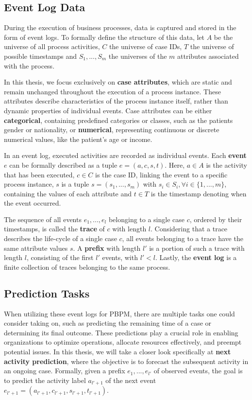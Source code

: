 
\subsection{Event Log Data}
\label{sec:event_log}
During the execution of business processes, data is captured and stored in the form of event logs.
To formally define the structure of this data,
let $A$ be the universe of all process activities,
$C$ the universe of case IDs,
$T$ the universe of possible timestamps
and $S_1, ..., S_m$ the universes of the $m$ attributes associated with the process.

In this thesis, we focus exclusively on \textbf{case attributes},
which are static and remain unchanged throughout the execution of a process instance.
These attributes describe characteristics of the process instance itself,
rather than dynamic properties of individual events.
Case attributes can be either \textbf{categorical},
containing predefined categories or classes, such as the patients gender or nationality,
or \textbf{numerical}, representing continuous or discrete numerical values, like the patient's age or income. 

In an event log, executed activities are recorded as individual events.
Each \textbf{event} $e$ can be formally described as a tuple $e = (a, c, s, t)$.
Here, $a \in A$ is the activity that has been executed,
$c \in C$ is the case ID, linking the event to a specific process instance,
$s$ is a tuple $s = (s_1, ..., s_m)$ with $s_i \in S_i, \forall i \in \{1, ..., m\}$,
containing the values of each attribute
and $t \in T$ is the timestamp denoting when the event occurred.

The sequence of all events $e_1, ..., e_l$ belonging to a single case $c$,
ordered by their timestamps, is called the \textbf{trace} of $c$ with length $l$.
Considering that a trace describes the life-cycle of a single case $c$,
all events belonging to a trace have the same attribute values $s$.
A \textbf{prefix} with length $l'$ is a portion of such a trace with length $l$,
consisting of the first $l'$ events, with $l' < l$.
Lastly, the \textbf{event log} is a finite collection of traces belonging to the same process.


\subsection{Prediction Tasks}
When utilizing these event logs for PBPM,
there are multiple tasks one could consider taking on,
such as predicting the remaining time of a case or determining its final outcome.
These predictions play a crucial role in enabling organizations to optimize operations,
allocate resources effectively, and preempt potential issues.
In this thesis, we will take a closer look specifically at \textbf{next activity prediction},
where the objective is to forecast the subsequent activity in an ongoing case.
Formally, given a prefix $e_1, ..., e_{l'}$ of observed events,
the goal is to predict the activity label $a_{l'+1}$ of the next event
$e_{l'+1} = (a_{l'+1}, c_{l'+1}, s_{l'+1}, t_{l'+1})$.

